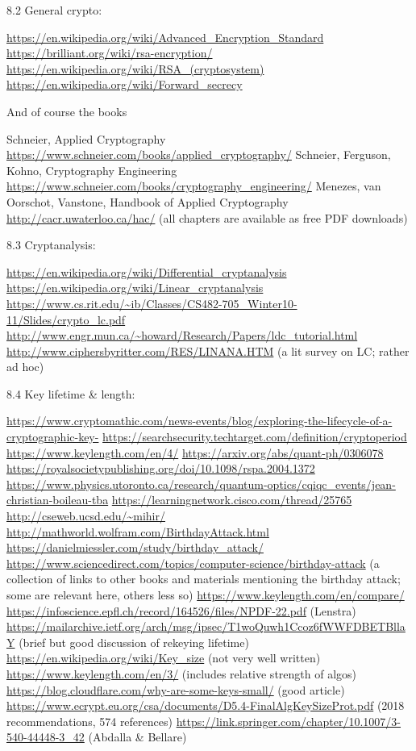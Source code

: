 \documentclass[%
 aip,
 jmp,%
 amsmath,amssymb,
 reprint,%
]{revtex4-1}
\begin{document}
8.2 General crypto:

\url{https://en.wikipedia.org/wiki/Advanced_Encryption_Standard }
\url{https://brilliant.org/wiki/rsa-encryption/}
\url{https://en.wikipedia.org/wiki/RSA_(cryptosystem)}
\url{https://en.wikipedia.org/wiki/Forward_secrecy}

And of course the books

Schneier, Applied Cryptography
\url{https://www.schneier.com/books/applied_cryptography/}
Schneier, Ferguson, Kohno, Cryptography Engineering
\url{https://www.schneier.com/books/cryptography_engineering/}
Menezes, van Oorschot, Vanstone, Handbook of Applied Cryptography
\url{http://cacr.uwaterloo.ca/hac/}
(all chapters are available as free PDF downloads)

8.3 Cryptanalysis:

\url{https://en.wikipedia.org/wiki/Differential_cryptanalysis}
\url{https://en.wikipedia.org/wiki/Linear_cryptanalysis}
\url{https://www.cs.rit.edu/~ib/Classes/CS482-705_Winter10-11/Slides/crypto_lc.pdf}
\url{http://www.engr.mun.ca/~howard/Research/Papers/ldc_tutorial.html}
\url{http://www.ciphersbyritter.com/RES/LINANA.HTM} (a lit survey on LC;
rather ad hoc)

8.4 Key lifetime \& length:

\url{https://www.cryptomathic.com/news-events/blog/exploring-the-lifecycle-of-a-cryptographic-key-}
\url{https://searchsecurity.techtarget.com/definition/cryptoperiod}
\url{https://www.keylength.com/en/4/}
\url{https://arxiv.org/abs/quant-ph/0306078}
\url{https://royalsocietypublishing.org/doi/10.1098/rspa.2004.1372}
\url{https://www.physics.utoronto.ca/research/quantum-optics/cqiqc_events/jean-christian-boileau-tba}
\url{https://learningnetwork.cisco.com/thread/25765}
\url{http://cseweb.ucsd.edu/~mihir/}
\url{http://mathworld.wolfram.com/BirthdayAttack.html}
\url{https://danielmiessler.com/study/birthday_attack/}
\url{https://www.sciencedirect.com/topics/computer-science/birthday-attack}
(a collection of links to other books and materials mentioning the
birthday attack; some are relevant here, others less so)
\url{https://www.keylength.com/en/compare/}
\url{https://infoscience.epfl.ch/record/164526/files/NPDF-22.pdf} (Lenstra)
\url{https://mailarchive.ietf.org/arch/msg/ipsec/T1woQuwh1Ccoz6fWWFDBETBllaY}
(brief but good discussion of rekeying lifetime)
\url{https://en.wikipedia.org/wiki/Key_size} (not very well written)
\url{https://www.keylength.com/en/3/} (includes relative strength of algos)
\url{https://blog.cloudflare.com/why-are-some-keys-small/} (good article)
\url{https://www.ecrypt.eu.org/csa/documents/D5.4-FinalAlgKeySizeProt.pdf}
(2018 recommendations, 574 references)
\url{https://link.springer.com/chapter/10.1007/3-540-44448-3_42} (Abdalla \& Bellare)
\end{document}
